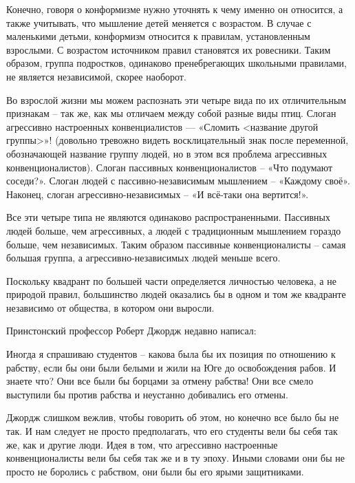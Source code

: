 \documentclass[ebook,12pt,oneside,openany]{memoir}
\begin{document}
Конечно, говоря о конформизме нужно уточнять к чему именно он
относится, а также учитывать, что мышление детей меняется с возрастом.
В случае с маленькими детьми, конформизм относится к правилам,
установленным взрослыми. С возрастом источником правил становятся их
ровесники. Таким образом, группа подростков, одинаково пренебрегающих
школьными правилами, не является независимой, скорее наоборот. \newline

Во взрослой жизни мы можем распознать эти четыре вида по их
отличительным признакам – так же, как мы отличаем между собой разные
виды птиц. Слоган агрессивно настроенных конвенциалистов — «Сломить
<название другой группы>»! (довольно тревожно видеть восклицательный
знак после переменной, обозначающей название группу людей, но в этом
вся проблема агрессивных конвенционалистов). Слоган пассивных
конвенционалистов – «Что подумают соседи?». Слоган людей с
пассивно-независимым мышлением – «Каждому своё». Наконец, слоган
агрессивно-независимых – «И всё-таки она вертится!». \newline

Все эти четыре типа не являются одинаково распространенными. Пассивных
людей больше, чем агрессивных, а людей с традиционным мышлением
гораздо больше, чем независимых. Таким образом пассивные
конвенционалисты – самая большая группа, а агрессивно-независимых
людей меньше всего. \newline

Поскольку квадрант по большей части определяется личностью человека, а
не природой правил, большинство людей оказались бы в одном и том же
квадранте независимо от общества, в котором они выросли. \newline

Принстонский профессор Роберт Джордж недавно написал:

\begin{displayquote}
Иногда я спрашиваю студентов – какова была бы их позиция по отношению
к рабству, если бы они были белыми и жили на Юге до освобождения
рабов. И знаете что? Они все были бы борцами за отмену рабства! Они
все смело выступили бы против рабства и неустанно добивались его
отмены.
\end{displayquote}

Джордж слишком вежлив, чтобы говорить об этом, но конечно все было бы
не так. И нам следует не просто предполагать, что его студенты вели бы
себя так же, как и другие люди. Идея в том, что агрессивно настроенные
конвенционалисты вели бы себя так же и в ту эпоху. Иными словами они
бы не просто не боролись с рабством, они были бы его ярыми
защитниками. \newline
\end{document}
